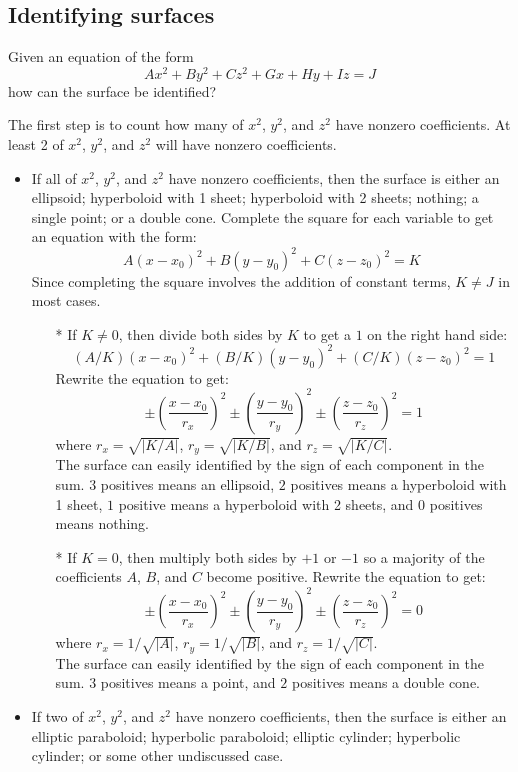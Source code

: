 \documentclass{article}
\begin{document}
\subsection*{Identifying surfaces}

Given an equation of the form
\[Ax^2 + By^2 + Cz^2 + Gx + Hy + Iz = J\]
how can the surface be identified?

The first step is to count how many of \(x^2\), \(y^2\), and \(z^2\) have nonzero coefficients. At least 2 of \(x^2\), \(y^2\), and \(z^2\) will have nonzero coefficients.
\begin{itemize}
	\item If all of \(x^2\), \(y^2\), and \(z^2\) have nonzero coefficients, then the surface is either an ellipsoid; hyperboloid with 1 sheet; hyperboloid with 2 sheets; nothing; a single point; or a double cone. Complete the square for each variable to get an equation with the form:
	\[A(x - x_0)^2 + B(y - y_0)^2 + C(z - z_0)^2 = K\]
	Since completing the square involves the addition of constant terms, \(K \neq J\) in most cases. 
	\begin{itemize}
		\item[*] If \(K \neq 0\), then divide both sides by \(K\) to get a \(1\) on the right hand side:
		\[(A/K)(x - x_0)^2 + (B/K)(y - y_0)^2 + (C/K)(z - z_0)^2 = 1\]
		Rewrite the equation to get:
		\[\pm\left(\frac{x - x_0}{r_x}\right)^2 \pm \left(\frac{y - y_0}{r_y}\right)^2 \pm\left(\frac{z - z_0}{r_z}\right)^2 = 1\]
		where \(r_x = \sqrt{|K/A|}\), \(r_y = \sqrt{|K/B|}\), and \(r_z = \sqrt{|K/C|}\). \\
		The surface can easily identified by the sign of each component in the sum. \(3\) positives means an ellipsoid, \(2\) positives means a hyperboloid with 1 sheet, \(1\) positive means a hyperboloid with 2 sheets, and \(0\) positives means nothing.
		\item[*] If \(K = 0\), then multiply both sides by \(+1\) or \(-1\) so a majority of the coefficients \(A\), \(B\), and \(C\) become positive. Rewrite the equation to get:
		\[\pm\left(\frac{x - x_0}{r_x}\right)^2 \pm \left(\frac{y - y_0}{r_y}\right)^2 \pm\left(\frac{z - z_0}{r_z}\right)^2 = 0\] 
		where \(r_x = 1/\sqrt{|A|}\), \(r_y = 1/\sqrt{|B|}\), and \(r_z = 1/\sqrt{|C|}\). \\
		The surface can easily identified by the sign of each component in the sum. \(3\) positives means a point, and \(2\) positives means a double cone.
	\end{itemize}
	\item If two of \(x^2\), \(y^2\), and \(z^2\) have nonzero coefficients, then the surface is either an elliptic paraboloid; hyperbolic paraboloid; elliptic cylinder; hyperbolic cylinder; or some other undiscussed case.   

\end{itemize}
\end{document}
